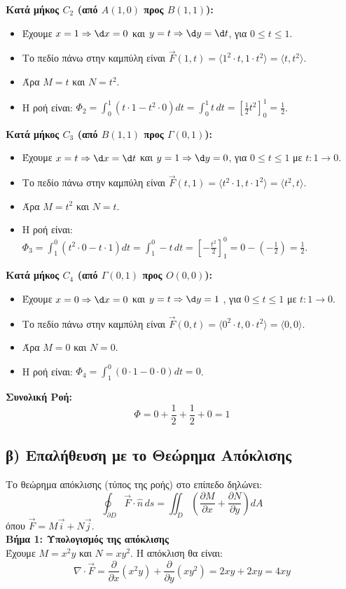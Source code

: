 \documentclass[a4paper,12pt,twoside]{article}
\begin{document}
\noindent\textbf{Κατά μήκος $C_2$ (από $A(1,0)$ προς $B(1,1)$):}
\begin{itemize}
    \item Έχουμε $x = 1 \Rightarrow \d x = 0$ και $y = t \Rightarrow \d y = \d t$, για $0 \le t \le 1$.
    \item Το πεδίο πάνω στην καμπύλη είναι $\vec{F}(1, t) = \langle 1^2 \cdot t, 1 \cdot t^2 \rangle = \langle t, t^2 \rangle$.
    \item Άρα $M=t$ και $N=t^2$.
    \item Η ροή είναι: $\Phi_2 = \int_0^1 (t \cdot 1 - t^2 \cdot 0) dt = \int_0^1 t \, dt = \left[\frac{1}{2}t^2\right]_0^1 = \frac{1}{2}$.
\end{itemize}

\noindent\textbf{Κατά μήκος $C_3$ (από $B(1,1)$ προς $\varGamma(0,1)$):}
\begin{itemize}
    \item Έχουμε $x = t \Rightarrow \d x = \d t$ και $y = 1 \Rightarrow \d y = 0$, για $0 \le t \le 1$ με $t:1\to 0$.
    \item Το πεδίο πάνω στην καμπύλη είναι $\vec{F}(t, 1) = \langle t^2 \cdot 1, t \cdot 1^2 \rangle = \langle t^2, t \rangle$.
    \item Άρα $M=t^2$ και $N=t$.
    \item Η ροή είναι: $\Phi_3 = \int_1^0 (t^2 \cdot 0 - t \cdot 1) dt = \int_1^0 -t \, dt = \left[-\frac{t^2}{2}\right]_1^0 = 0 - \left(-\frac{1}{2}\right) = \frac{1}{2}$.
\end{itemize}

\noindent\textbf{Κατά μήκος $C_4$ (από $\varGamma(0,1)$ προς $O(0,0)$):}
\begin{itemize}
    \item Έχουμε $x = 0 \Rightarrow \d x = 0$ και $y = t \Rightarrow \d y = 1$ , για $0 \le t \le 1$ με $t:1\to 0$.
    \item Το πεδίο πάνω στην καμπύλη είναι $\vec{F}(0, t) = \langle 0^2 \cdot t, 0 \cdot t^2 \rangle = \langle 0, 0 \rangle$.
    \item Άρα $M=0$ και $N=0$.
    \item Η ροή είναι: $\Phi_4 = \int_1^0 (0 \cdot 1 - 0 \cdot 0) dt = 0$.
\end{itemize}

\noindent\textbf{Συνολική Ροή:}
\[ \Phi = 0 + \frac{1}{2} + \frac{1}{2} + 0 = 1 \]

\subsection*{β) Επαλήθευση με το Θεώρημα Απόκλισης}
Το θεώρημα απόκλισης (τύπος της ροής) στο επίπεδο δηλώνει:
\[ \oint_{\partial D} \vec{F} \cdot \hat{n} \, ds = \iint_D \left(\frac{\partial M}{\partial x} + \frac{\partial N}{\partial y}\right) dA \]
όπου $\vec{F} = M\vec{i} + N\vec{j}$.
\noindent\\
\textbf{Βήμα 1: Υπολογισμός της απόκλισης}\\
Έχουμε $M = x^2 y$ και $N = xy^2$. Η απόκλιση θα είναι:
\[ \nabla \cdot \vec{F} = \frac{\partial}{\partial x}(x^2 y) + \frac{\partial}{\partial y}(xy^2) = 2xy + 2xy = 4xy \]
\end{document}
